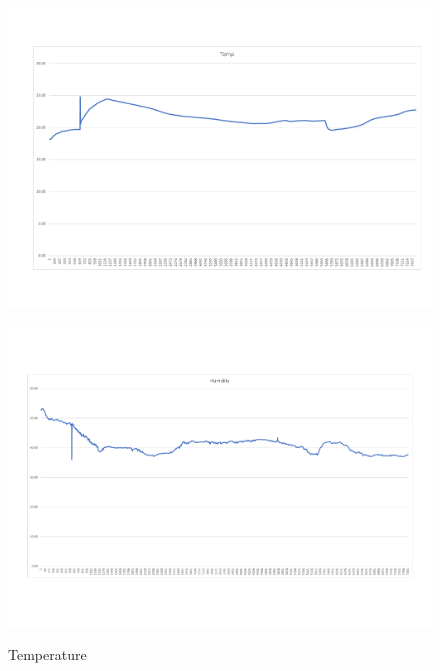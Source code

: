 \begin{figure}[!htb]
	\includegraphics[width=\textwidth]{body/fig/Temp.pdf}%
\caption{Temperature}
\label{fig:temp}
	\endminipage\hfill
	\includegraphics[width=\textwidth]{body/fig/hum.pdf}%
\label{fig:hum}
	\endminipage\hfill
	
\end{figure}


